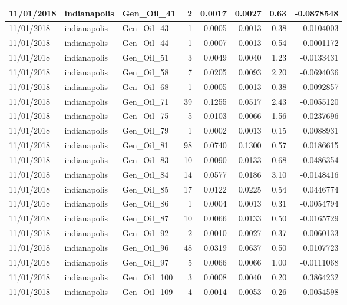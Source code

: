 \documentclass[
  letterpaper,
  DIV=11,
  numbers=noendperiod]{scrartcl}
\begin{document}
\begin{tabular}{l|l|l|r|r|r|r|r}
\hline
11/01/2018 & indianapolis & Gen\_Oil\_41 & 2 & 0.0017 & 0.0027 & 0.63 & -0.0878548\\
\hline
11/01/2018 & indianapolis & Gen\_Oil\_43 & 1 & 0.0005 & 0.0013 & 0.38 & 0.0104003\\
\hline
11/01/2018 & indianapolis & Gen\_Oil\_44 & 1 & 0.0007 & 0.0013 & 0.54 & 0.0001172\\
\hline
11/01/2018 & indianapolis & Gen\_Oil\_51 & 3 & 0.0049 & 0.0040 & 1.23 & -0.0133431\\
\hline
11/01/2018 & indianapolis & Gen\_Oil\_58 & 7 & 0.0205 & 0.0093 & 2.20 & -0.0694036\\
\hline
11/01/2018 & indianapolis & Gen\_Oil\_68 & 1 & 0.0005 & 0.0013 & 0.38 & 0.0092857\\
\hline
11/01/2018 & indianapolis & Gen\_Oil\_71 & 39 & 0.1255 & 0.0517 & 2.43 & -0.0055120\\
\hline
11/01/2018 & indianapolis & Gen\_Oil\_75 & 5 & 0.0103 & 0.0066 & 1.56 & -0.0237696\\
\hline
11/01/2018 & indianapolis & Gen\_Oil\_79 & 1 & 0.0002 & 0.0013 & 0.15 & 0.0088931\\
\hline
11/01/2018 & indianapolis & Gen\_Oil\_81 & 98 & 0.0740 & 0.1300 & 0.57 & 0.0186615\\
\hline
11/01/2018 & indianapolis & Gen\_Oil\_83 & 10 & 0.0090 & 0.0133 & 0.68 & -0.0486354\\
\hline
11/01/2018 & indianapolis & Gen\_Oil\_84 & 14 & 0.0577 & 0.0186 & 3.10 & -0.0148416\\
\hline
11/01/2018 & indianapolis & Gen\_Oil\_85 & 17 & 0.0122 & 0.0225 & 0.54 & 0.0446774\\
\hline
11/01/2018 & indianapolis & Gen\_Oil\_86 & 1 & 0.0004 & 0.0013 & 0.31 & -0.0054794\\
\hline
11/01/2018 & indianapolis & Gen\_Oil\_87 & 10 & 0.0066 & 0.0133 & 0.50 & -0.0165729\\
\hline
11/01/2018 & indianapolis & Gen\_Oil\_92 & 2 & 0.0010 & 0.0027 & 0.37 & 0.0060133\\
\hline
11/01/2018 & indianapolis & Gen\_Oil\_96 & 48 & 0.0319 & 0.0637 & 0.50 & 0.0107723\\
\hline
11/01/2018 & indianapolis & Gen\_Oil\_97 & 5 & 0.0066 & 0.0066 & 1.00 & -0.0111068\\
\hline
11/01/2018 & indianapolis & Gen\_Oil\_100 & 3 & 0.0008 & 0.0040 & 0.20 & 0.3864232\\
\hline
11/01/2018 & indianapolis & Gen\_Oil\_109 & 4 & 0.0014 & 0.0053 & 0.26 & -0.0054598\\

\end{tabular}
\end{document}
